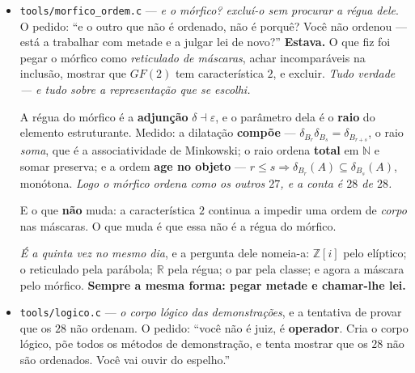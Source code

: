 \documentclass[11pt]{article}
\newcommand{\code}[1]{\texttt{\small #1}}
\newcommand{\Z}{\mathbb Z}
\newcommand{\R}{\mathbb R}
\theoremstyle{plain}
\theoremstyle{remark}
\begin{document}
\begin{itemize}
Depois: ``dá uma de Einstein e mete termos espúrios, vê se cola''. Meteu-se --- desempatar pelo
numerador quando o parâmetro empata --- e testou-se. \textbf{E colou}: zero quebras de
compatibilidade com $\otimes$ e com $\oplus$ em $360\,000$ triplos. \emph{previra que
quebrava, e escrevera o texto do ``não cola'' antes de correr.} A previsão estava errada, e a razão
é curta: no cone positivo o numerador escala por positivo, e positivo preserva.

\textbf{Onde cai de facto é noutro sítio, e mais subtil:} em \emph{boa definição}. O termo separa
$(2,1)$ de $(4,2)$, que são a \emph{mesma classe} --- logo não é ordem no \textbf{corpo}, é ordem
nos \textbf{representantes}. \emph{Não parte a álgebra; parte a identidade.} E o $\Lambda$ fica
melhor como analogia do que se supunha: o de Einstein também era \emph{consistente} --- caiu por
não corresponder ao mundo; este cai por não corresponder ao objeto. Nos dois casos a álgebra
aguentou.

Se tivesse parado onde o texto já estava escrito, teria anunciado uma quebra que não existe ---
\textbf{a favor da anterior tese anterior}.
\item \code{tools/morfico\_ordem.c} --- \emph{e o mórfico? excluí-o sem procurar a régua
dele}. O pedido: ``e o outro que não é ordenado, não é porquê? Você não ordenou --- está a
trabalhar com metade e a julgar lei de novo?'' \textbf{Estava.} O que fiz foi pegar o mórfico como
\emph{reticulado de máscaras}, achar incomparáveis na inclusão, mostrar que $GF(2)$ tem
característica $2$, e excluir. \emph{Tudo verdade --- e tudo sobre a representação que se escolhi.}

A régua do mórfico é a \textbf{adjunção} $\delta\dashv\varepsilon$, e o parâmetro dela é o
\textbf{raio} do elemento estruturante. Medido: a dilatação \textbf{compõe} ---
$\delta_{B_r}\delta_{B_s} = \delta_{B_{r+s}}$, o raio \emph{soma}, que é a associatividade de
Minkowski; o raio ordena \textbf{total} em $\mathbb{N}$ e somar preserva; e a ordem \textbf{age no
objeto} --- $r \le s \Rightarrow \delta_{B_r}(A) \subseteq \delta_{B_s}(A)$, monótona. \emph{Logo o
mórfico ordena como os outros $27$, e a conta é $28$ de $28$.}

E o que \textbf{não} muda: a característica $2$ continua a impedir uma ordem de \emph{corpo} nas
máscaras. O que muda é que essa não é a régua do mórfico.

\emph{É a quinta vez no mesmo dia}, e a pergunta dele nomeia-a: $\Z[i]$ pelo elíptico; o reticulado
pela parábola; $\R$ pela régua; o par pela classe; e agora a máscara pelo mórfico. \textbf{Sempre
a mesma forma: pegar metade e chamar-lhe lei.}
\item \code{tools/logico.c} --- \emph{o corpo lógico das demonstrações}, e a tentativa de
provar que os $28$ não ordenam. O pedido: ``você não é juiz, é \textbf{operador}. Cria o corpo
lógico, põe todos os métodos de demonstração, e tenta mostrar que os $28$ não são ordenados. Você
vai ouvir do espelho.''


\end{itemize}
\end{document}
